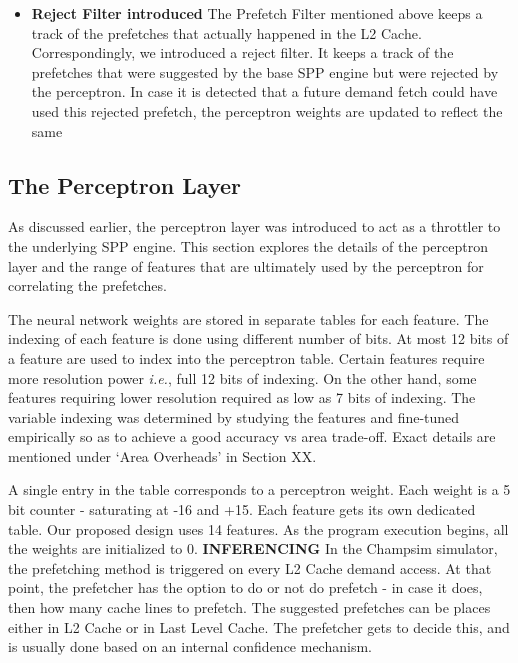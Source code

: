 \documentclass{sig-alternate}
\begin{document}
\begin{itemize}
\item \textbf{Reject Filter introduced}\newline
The Prefetch Filter mentioned above keeps a track of the prefetches that actually happened in the L2 Cache. 
Correspondingly, we introduced a reject filter. 
It keeps a track of the prefetches that were suggested by the base SPP engine but were rejected by the perceptron. 
In case it is detected that a future demand fetch could have used this rejected prefetch, the perceptron weights are updated to reflect the same

\end{itemize}

\subsection{The Perceptron Layer}
As discussed earlier, the perceptron layer was introduced to act as a throttler to the underlying SPP engine. 
This section explores the details of the perceptron layer and the range of features that are ultimately used by the perceptron for correlating the prefetches.

The neural network weights are stored in separate tables for each feature.
The indexing of each feature is done using different number of bits.
At most 12 bits of a feature are used to index into the perceptron table.
Certain features require more resolution power \textit{i.e.}, full 12 bits of indexing.
On the other hand, some features requiring lower resolution required as low as 7 bits of indexing.
The variable indexing was determined by studying the features and fine-tuned empirically so as to achieve a good accuracy vs area trade-off.
Exact details are mentioned under `Area Overheads' in Section XX.

A single entry in the table corresponds to a perceptron weight.
Each weight is a 5 bit counter - saturating at -16 and +15. 
Each feature gets its own dedicated table. 
Our proposed design uses 14 features. 
As the program execution begins, all the weights are initialized to 0.
\newline \newline
\textbf{INFERENCING}\newline
In the Champsim simulator, the prefetching method is triggered on every L2 Cache demand access. 
At that point, the prefetcher has the option to do or not do prefetch - in case it does, then how many cache lines to prefetch. 
The suggested prefetches can be places either in L2 Cache or in Last Level Cache. 
The prefetcher gets to decide this, and is usually done based on an internal confidence mechanism.
\end{document}
